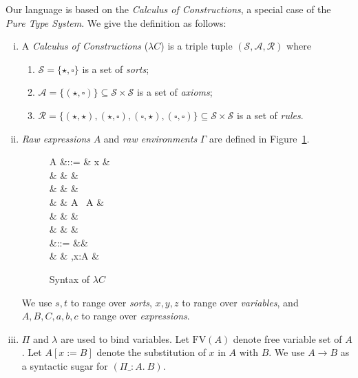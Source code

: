 Our language is based on the \emph{Calculus of Constructions}, a special case of the \emph{Pure Type System}. We give the definition as follows:

\begin{enumerate}[(i)]
\item A \emph{Calculus of Constructions} ($\lambda C$) is a triple tuple
  $(\mathcal{S},\mathcal{A},\mathcal{R})$ where

  \begin{enumerate}
  \item $\mathcal{S} = \{\star,\square\}$ is a set of \emph{sorts};
  \item $\mathcal{A} = \{(\star, \square)\} \subseteq \mathcal{S} \times \mathcal{S}$ is a set
    of \emph{axioms};
  \item
    $\mathcal{R} = \{(\star, \star), (\star, \square), (\square,
    \star), (\square, \square)\}\subseteq \mathcal{S} \times \mathcal{S}$ is a set of \emph{rules}.
  \end{enumerate}

\item \emph{Raw expressions} $A$ and \emph{raw environments} $\Gamma$
  are defined in Figure~\ref{fig:cocsyn}.

\begin{figure}[ht]
\small
\begin{syntax}
  A &::= & x &  \\
    & \mid & \star &  \\
    & \mid & \square &  \\
    & \mid & A \ A &  \\
    & \mid &  &  \\
    & \mid &  &  \\
  \Gamma &::= &\varnothing &  \\
         & \mid & \Gamma,x:A & 
\end{syntax}
\caption{Syntax of $\lambda C$}\label{fig:cocsyn}
\end{figure}
  We use $s,t$ to range over \emph{sorts}, $x,y,z$ to
  range over \emph{variables}, and $A,B,C,a,b,c$ to range over
  \emph{expressions}.

\item $\Pi$ and $\lambda$ are used to bind variables. Let
  $\mathrm{FV}(A)$ denote free variable set of $A$. Let $A[x:=B]$
  denote the substitution of $x$ in $A$ with $B$. We use $A \to B$ as a syntactic sugar
  for $(\Pi \_:A.\ B)$.


\end{enumerate}

